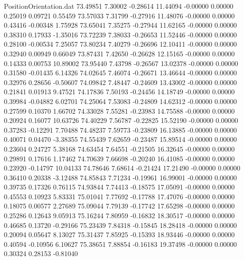 \begin{filecontents}{PositionOrientation.dat}
  73.49851    7.30002   -0.28614    11.44094   -0.00000    0.00000    0.25019    0.09721    0.55459
  73.57033    7.31799   -0.27916    11.48076   -0.00000    0.00000    0.43416   -0.00348    1.75928
  73.65041    7.35275   -0.27944    11.62165   -0.00000    0.00000    0.38310    0.17933   -1.35016
  73.72239    7.38033   -0.26653    11.52446   -0.00000    0.00000    0.28100   -0.00534    7.25057
  73.80234    7.40279   -0.26696    12.10411   -0.00000    0.00000    0.32940    0.00949    0.66049
  73.87431    7.42650   -0.26628    12.15165   -0.00000    0.00000    0.14333    0.00753   10.89002
  73.95440    7.43798   -0.26567    13.02378   -0.00000    0.00000    0.31580   -0.01435    6.14326
  74.02645    7.46074   -0.26671    13.46644   -0.00000    0.00000    0.32976    0.28656   -0.50607
  74.09842    7.48447   -0.24609    13.43002   -0.00000    0.00000    0.21841    0.01913    9.47521
  74.17836    7.50193   -0.24456    14.18749   -0.00000    0.00000    0.39984   -0.04882    6.02701
  74.25064    7.53083   -0.24809    14.62312   -0.00000    0.00000    0.27599    0.10370    1.66702
  74.33028    7.55281   -0.23983    14.75588   -0.00000    0.00000    0.20924    0.16077   10.63726
  74.40229    7.56787   -0.22825    15.52190   -0.00000    0.00000    0.37283   -0.12291    7.70488
  74.48237    7.59773   -0.23809    16.13885   -0.00000    0.00000    0.40071    0.04470   -3.38355
  74.55439    7.62659   -0.23487    15.89514   -0.00000    0.00000    0.23604    0.24727    5.38168
  74.63454    7.64551   -0.21505    16.32645   -0.00000    0.00000    0.29891    0.17616    1.17462
  74.70639    7.66698   -0.20240    16.41085   -0.00000    0.00000    0.23920   -0.14797   10.04133
  74.78646    7.68614   -0.21424    17.21490   -0.00000    0.00000    0.36410    0.20338   -3.12488
  74.85843    7.71234   -0.19961    16.99001   -0.00000    0.00000    0.39735    0.17326    0.76115
  74.93844    7.74413   -0.18575    17.05091   -0.00000    0.00000    0.45553    0.10923    5.83331
  75.01041    7.77692   -0.17788    17.47076   -0.00000    0.00000    0.18075    0.00577    2.27689
  75.09044    7.79139   -0.17742    17.65298   -0.00000    0.00000    0.25286    0.12643    9.05913
  75.16244    7.80959   -0.16832    18.30517   -0.00000    0.00000    0.46685    0.13720   -0.29166
  75.23439    7.84318   -0.15845    18.28418   -0.00000    0.00000    0.20094    0.05647    8.13027
  75.31437    7.85925   -0.15393    18.93446   -0.00000    0.00000    0.40594   -0.10956    6.10627
  75.38651    7.88854   -0.16183    19.37498   -0.00000    0.00000    0.30324    0.28153   -0.81040

\end{filecontents}
